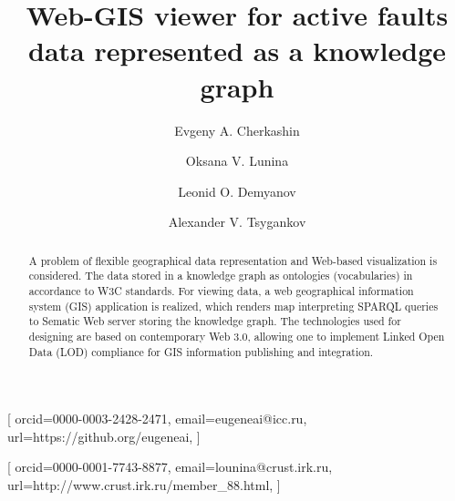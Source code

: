 \documentclass[
]{ceurart}
\begin{document}


\title{Web-GIS viewer for active faults data represented as a knowledge graph}

\author[1,3,4]{Evgeny A. Cherkashin}[%
orcid=0000-0003-2428-2471,
email=eugeneai@icc.ru,
url=https://github.org/eugeneai,
]
\address[1]{Matrosov Institute for System Dynamics and Control Theory of Siberian Branch of Russian Academy of Sciences, 134 Lermontov St, Irkutsk, 664033, Russian Federation}

\author[2]{Oksana V. Lunina}[%
orcid=0000-0001-7743-8877,
email=lounina@crust.irk.ru,
url=http://www.crust.irk.ru/member_88.html,
]

\address[2]{Institute of the Earth’s Crust of Siberian Branch of Russian Academy of Sciences, 128 Lermontov St, Irkutsk, 664033, Russian Federation}

\author[3]{Leonid O. Demyanov}

\address[3]{Institute for Mathematics and Information Technologies, Irkutsk State University, 20~Gagarina Bulv, Irkutsk, 664003, Russian Federation}

\author[4]{Alexander V. Tsygankov}

\address[4]{Institute for Information Technologies and Data Analysis, National Research Irkutsk State Technical University, 83~Lermontov St, Irkutsk, 664074, Russian Federation}

\begin{abstract}
  A problem of flexible geographical data representation and Web-based visualization is considered.  The data stored in a knowledge graph as ontologies (vocabularies) in accordance to W3C standards.  For viewing data, a web geographical information system (GIS) application is realized, which renders map interpreting SPARQL queries to Sematic Web server storing the knowledge graph.  The technologies used for designing are based on contemporary Web 3.0, allowing one to implement Linked Open Data (LOD) compliance for GIS information publishing and integration.
\end{abstract}
\end{document}

